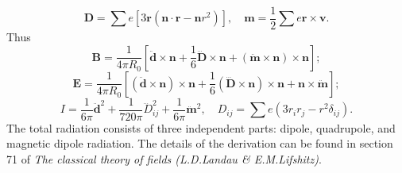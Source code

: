 \[\bm{D} = \sum e[3\bm{r}(\bm{n}\cdot\bm{r} - \bm{n}r^2)] , \quad \bm{m} = \frac{1}{2} \sum e\bm{r}\times\bm{v}.\]
Thus
\[\bm{B} = \frac{1}{4\pi R_0} \left[ \ddot{\bm{d}} \times \bm{n} + \frac{1}{6}\dddot{\bm{D}}\times\bm{n} + (\ddot{\bm{m}}\times\bm{n})\times\bm{n}\right];\]
\[\bm{E} = \frac{1}{4\pi R_0} \left[ (\ddot{\bm{d}} \times \bm{n})\times \bm{n} + \frac{1}{6}(\dddot{\bm{D}}\times\bm{n})\times \bm{n} + \bm{n} \times \ddot{\bm{m}}\right];\]
\[I = \frac{1}{6\pi}\ddot{\bm{d}}^2 + \frac{1}{720\pi} \dddot{D}_{ij}^2 + \frac{1}{6\pi} \ddot{\bm{m}}^2 , \quad D_{ij} = \sum e(3r_{i}r_{j}-r^2\delta_{ij}).\]
The total radiation consists of three independent parts:
dipole, quadrupole, and magnetic dipole radiation. The details of the derivation can be found in section 71 of \emph{The classical theory of fields (L.D.Landau \& E.M.Lifshitz)}.

